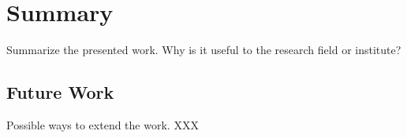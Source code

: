 \chapter{Summary}
\label{s:Summary}

Summarize the presented work. Why is it useful to the research field or institute?


\section{Future Work}
\label{ss:FutureWork}

Possible ways to extend the work. XXX


